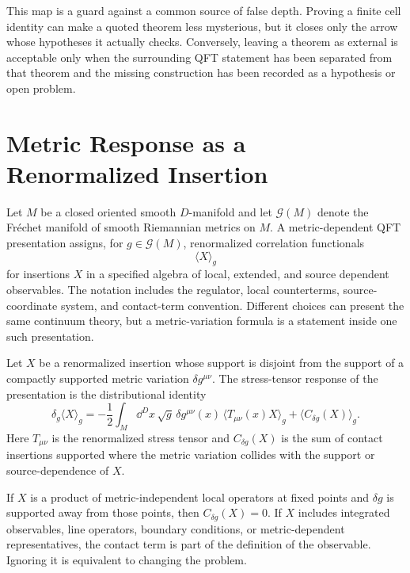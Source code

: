 This map is a guard against a common source of false depth.  Proving a finite
cell identity can make a quoted theorem less mysterious, but it closes only the
arrow whose hypotheses it actually checks.  Conversely, leaving a theorem as
external is acceptable only when the surrounding QFT statement has been
separated from that theorem and the missing construction has been recorded as a
hypothesis or open problem.

\section{Metric Response as a Renormalized Insertion}

Let \(M\) be a closed oriented smooth \(D\)-manifold and let
\(\mathcal G(M)\) denote the Fréchet manifold of smooth Riemannian metrics on
\(M\).  A metric-dependent QFT presentation assigns, for \(g\in\mathcal G(M)\),
renormalized correlation functionals
\[
  \langle X\rangle_g
\]
for insertions \(X\) in a specified algebra of local, extended, and source
dependent observables.  The notation includes the regulator, local
counterterms, source-coordinate system, and contact-term convention.  Different choices
can present the same continuum theory, but a metric-variation formula is a
statement inside one such presentation.

\begin{definition}
\label{def:stress-tensor-response}
Let \(X\) be a renormalized insertion whose support is disjoint from the
support of a compactly supported metric variation \(\delta g^{\mu\nu}\).
The stress-tensor response of the presentation is the distributional
identity
\begin{equation}
  \delta_g\langle X\rangle_g
  =
  -\frac12
  \int_M\dd^Dx\,\sqrt g\,\delta g^{\mu\nu}(x)\,
  \langle T_{\mu\nu}(x)X\rangle_g
  +
  \langle C_{\delta g}(X)\rangle_g .
  \label{eq:tqft-stress-response}
\end{equation}
Here \(T_{\mu\nu}\) is the renormalized stress tensor and
\(C_{\delta g}(X)\) is the sum of contact insertions supported where the
metric variation collides with the support or source-dependence of \(X\).
\end{definition}

If \(X\) is a product of metric-independent local operators at fixed points
and \(\delta g\) is supported away from those points, then
\(C_{\delta g}(X)=0\).  If \(X\) includes integrated observables, line
operators, boundary conditions, or metric-dependent representatives, the
contact term is part of the definition of the observable.  Ignoring it is
equivalent to changing the problem.

